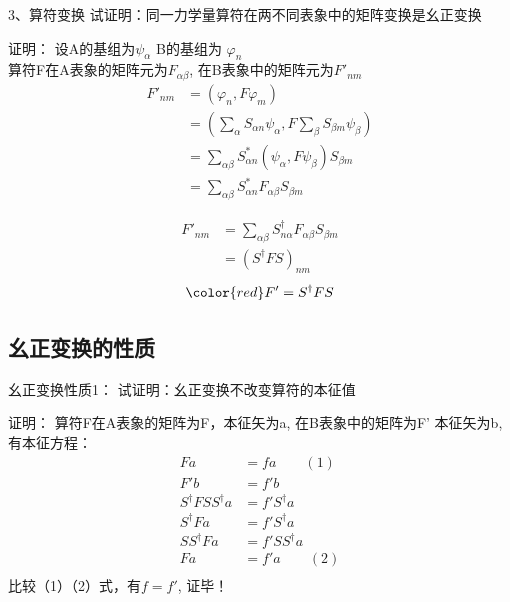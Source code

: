 \begin{frame} 
    \begin{tcolorbox1}{3、算符变换}
        试证明：同一力学量算符在两不同表象中的矩阵变换是幺正变换  
    \end{tcolorbox1}
    \alert{证明：} 设A的基组为$\psi_\alpha$ B的基组为 $\varphi_n$\\
    算符F在A表象的矩阵元为$F_{\alpha\beta}$, 在B表象中的矩阵元为$F'_{nm}$
    \begin{equation*}
        \begin{split}
            F'_{nm} &= (\varphi_n, F\varphi_m) \\
            &= (\sum_{\alpha} S_{\alpha n}\psi_\alpha, F \sum_{\beta} S_{\beta m}\psi_\beta)\\
            &= \sum_{\alpha\beta} S_{\alpha n} ^* (\psi_\alpha, F \psi_\beta) S_{\beta m}\\
            &= \sum_{\alpha\beta} S_{\alpha n} ^* F_{\alpha\beta} S_{\beta m}
        \end{split} 
    \end{equation*}
\end{frame}


\begin{frame} 
    \begin{equation*}
    \begin{split}
        F'_{nm} &= \sum_{\alpha\beta} S_{n\alpha } ^{\dagger} F_{\alpha\beta} S_{\beta m} \\
        &= (S^{\dagger} F S)_{nm}
    \end{split} 
    \end{equation*} 
    $$\color{red} F'= S^{\dagger} F S $$
\end{frame}

\subsection{幺正变换的性质}

\begin{frame} 
    \begin{tcolorbox1}{幺正变换性质1：}
        试证明：幺正变换不改变算符的本征值 
    \end{tcolorbox1}
    \alert{证明：}
    算符F在A表象的矩阵为F，本征矢为a, 在B表象中的矩阵为F' 本征矢为b,有本征方程：
    \begin{equation*}
        \begin{split}
            Fa&=fa \qquad (1)\\
            F'b&=f'b\\
            S^{\dagger} F S S^{\dagger}a &=f'S^{\dagger}a\\
            S^{\dagger} F a &=f'S^{\dagger}a\\
            SS^{\dagger} F a &=f'SS^{\dagger}a\\
            F a &=f'a \qquad (2)\\
        \end{split} 
    \end{equation*} 
    比较（1）（2）式，有$f=f'$, 证毕！
\end{frame}    

